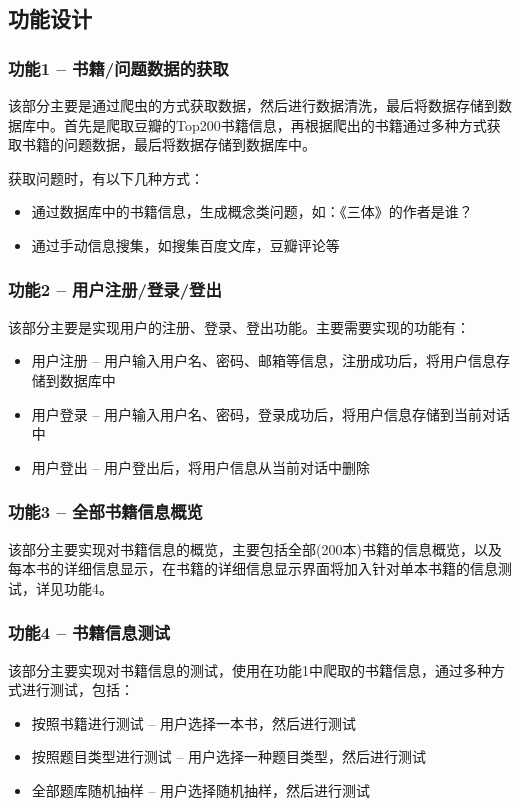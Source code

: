 \documentclass[twoside,11pt]{article}
\begin{document}
\subsection{功能设计}

\subsubsection{功能1 -- 书籍/问题数据的获取}
该部分主要是通过爬虫的方式获取数据，然后进行数据清洗，最后将数据存储到数据库中。首先是爬取豆瓣的Top200书籍信息，再根据爬出的书籍通过多种方式获取书籍的问题数据，最后将数据存储到数据库中。

获取问题时，有以下几种方式：
\begin{itemize}
    \item 通过数据库中的书籍信息，生成概念类问题，如：《三体》的作者是谁？
    \item 通过手动信息搜集，如搜集百度文库，豆瓣评论等
\end{itemize}

\vspace{0.5cm}

\subsubsection{功能2 -- 用户注册/登录/登出}
该部分主要是实现用户的注册、登录、登出功能。主要需要实现的功能有：
\begin{itemize}
    \item 用户注册 -- 用户输入用户名、密码、邮箱等信息，注册成功后，将用户信息存储到数据库中
    \item 用户登录 -- 用户输入用户名、密码，登录成功后，将用户信息存储到当前对话中
    \item 用户登出 -- 用户登出后，将用户信息从当前对话中删除
\end{itemize}

\vspace{0.5cm}

\subsubsection{功能3 -- 全部书籍信息概览}
该部分主要实现对书籍信息的概览，主要包括全部(200本)书籍的信息概览，以及每本书的详细信息显示，在书籍的详细信息显示界面将加入针对单本书籍的信息测试，详见功能4。


\vspace{0.5cm}

\subsubsection{功能4 -- 书籍信息测试}
该部分主要实现对书籍信息的测试，使用在功能1中爬取的书籍信息，通过多种方式进行测试，包括：
\begin{itemize}
    \item 按照书籍进行测试 -- 用户选择一本书，然后进行测试
    \item 按照题目类型进行测试 -- 用户选择一种题目类型，然后进行测试
    \item 全部题库随机抽样 -- 用户选择随机抽样，然后进行测试
\end{itemize}
\end{document}
